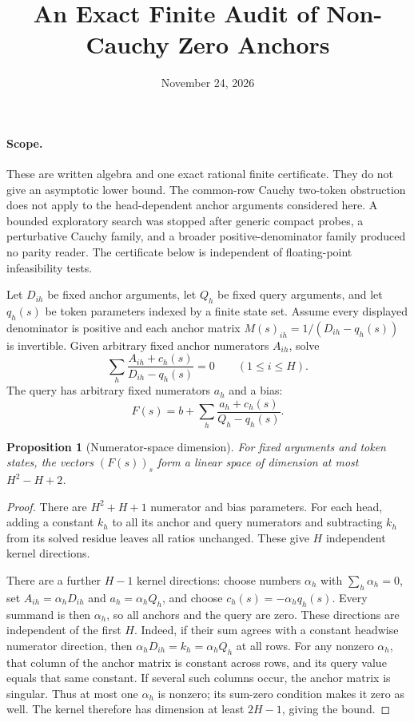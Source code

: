 \documentclass[11pt]{article}
\title{An Exact Finite Audit of Non-Cauchy Zero Anchors}
\author{}
\date{November 24, 2026}
\newtheorem{proposition}{Proposition}
\begin{document}
\maketitle

\paragraph{Scope.}
These are written algebra and one exact rational finite certificate.
They do not give an asymptotic lower bound. The common-row Cauchy
two-token obstruction does not apply to the head-dependent anchor
arguments considered here. A bounded exploratory search was stopped
after generic compact probes, a perturbative Cauchy family, and a
broader positive-denominator family produced no parity reader. The
certificate below is independent of floating-point infeasibility tests.

Let $D_{ih}$ be fixed anchor arguments, let $Q_h$ be fixed query
arguments, and let $q_h(s)$ be token parameters indexed by a finite
state set. Assume every displayed denominator is positive and each
anchor matrix $M(s)_{ih}=1/(D_{ih}-q_h(s))$ is invertible. Given
arbitrary fixed anchor numerators $A_{ih}$, solve
\[
 \sum_h\frac{A_{ih}+c_h(s)}{D_{ih}-q_h(s)}=0
 \qquad(1\leq i\leq H).
\]
The query has arbitrary fixed numerators $a_h$ and a bias:
\[
 F(s)=b+\sum_h\frac{a_h+c_h(s)}{Q_h-q_h(s)}.
 \tag{1}
\]

\begin{proposition}[Numerator-space dimension]
For fixed arguments and token states, the vectors $(F(s))_s$ form
a linear space of dimension at most $H^2-H+2$.
\end{proposition}
\begin{proof}
There are $H^2+H+1$ numerator and bias parameters. For each head,
adding a constant $k_h$ to all its anchor and query numerators and
subtracting $k_h$ from its solved residue leaves all ratios unchanged.
These give $H$ independent kernel directions.

There are a further $H-1$ kernel directions: choose numbers
$\alpha_h$ with $\sum_h\alpha_h=0$, set
$A_{ih}=\alpha_hD_{ih}$ and $a_h=\alpha_hQ_h$, and choose
$c_h(s)=-\alpha_hq_h(s)$. Every summand is then $\alpha_h$, so
all anchors and the query are zero. These directions are independent
of the first $H$. Indeed, if their sum agrees with a constant
headwise numerator direction, then
$\alpha_hD_{ih}=k_h=\alpha_hQ_h$ at all rows. For any nonzero
$\alpha_h$, that column of the anchor matrix is constant across
rows, and its query value equals that same constant. If several
such columns occur, the anchor matrix is singular. Thus at most one
$\alpha_h$ is nonzero; its sum-zero condition makes it zero as well.
The kernel therefore has dimension at least $2H-1$, giving the bound.
\end{proof}
\end{document}
